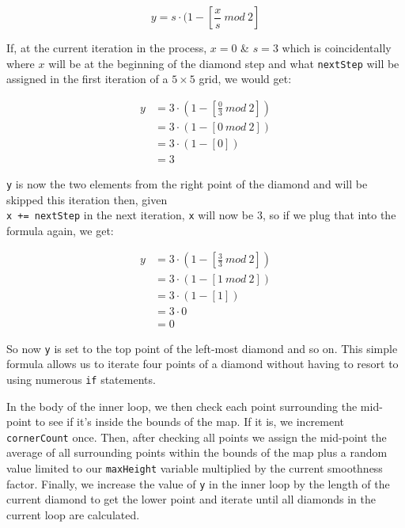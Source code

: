 \documentclass{article}
\begin{document}
\begin{equation}
y=s \cdot (1 - \left[\frac{x}{s} \ mod \ 2\right]
\end{equation}

If, at the current iteration in the process, $x=0$ \& $s=3$ which is coincidentally where $x$ will be at the beginning of the diamond step and what \texttt{nextStep} will be assigned in the first iteration of a $5 \times 5$ grid, we would get:

\begin{equation}
\begin{split}
y&=3 \cdot (1 - \left[\frac{0}{3} \ mod \ 2\right]) \\
&=3 \cdot (1 - \left[0 \ mod \ 2\right]) \\
&=3 \cdot (1 - [0]) \\
&=3
\end{split}
\end{equation}

\texttt{y} is now the two elements from the right point of the diamond and will be skipped this iteration then, given
\\ \texttt{x += nextStep} in the next iteration, \texttt{x} will now be $3$, so if we plug that into the formula again, we get:

\begin{equation}
\begin{split}
y&=3 \cdot (1 - \left[\frac{3}{3} \ mod \ 2\right]) \\
&=3 \cdot (1 - \left[1 \ mod \ 2\right]) \\
&=3 \cdot (1 - [1]) \\
&=3 \cdot 0 \\
&=0
\end{split}
\end{equation}

So now \texttt{y} is set to the top point of the left-most diamond and so on. This simple formula allows us to iterate four points of a diamond without having to resort to using numerous \texttt{if} statements.

In the body of the inner loop, we then check each point surrounding the mid-point to see if it's inside the bounds of the map. If it is, we increment \texttt{cornerCount} once. Then, after checking all points we assign the mid-point the average of all surrounding points within the bounds of the map plus a random value limited to our \texttt{maxHeight} variable multiplied by the current smoothness factor. Finally, we increase the value of \texttt{y} in the inner loop by the length of the current diamond to get the lower point and iterate until all diamonds in the current loop are calculated.
\end{document}
